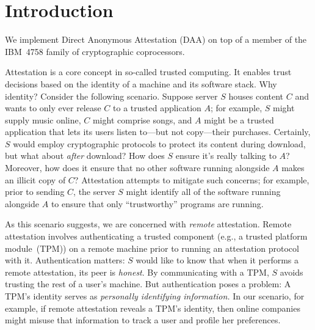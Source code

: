 \section{Introduction}

\begin{comment}
	\emph{PDS:}
	Our goal is to motivate and sketch out our work.
	
	At the moment, I've simply dropped in a copy of our proposal.
	Even if those ideas suffice, we clearly need to adjust the text since
	we're now talking about what we have done rather
	than what we propose to do.
	
	Let's consider improving the ideas.
	
	I want to move away from
	TCG-style attestation to the more general problem of
	\emph{authenticating a remote application}.
	Identifying
	all of the software running on a machine may well uniquely
	identify the machine.
	Authentication without inherently leaking identity enables
	attestation. What other protocols does it enable?
	Voting protocols?
\end{comment}
\fi

We implement Direct Anonymous Attestation (DAA) on top of
a member of the IBM~4758 family of
cryptographic coprocessors.

Attestation is a core concept in so-called trusted computing.
It enables trust decisions based on the identity of a machine
and its software stack.
Why identity?
Consider the following scenario.
Suppose server $S$ houses content $C$ and wants to
only ever release $C$ to a trusted application $A$;
for example, $S$ might supply music online,
$C$ might comprise songs,
and $A$ might be a trusted application that
lets its users listen to---but not copy---their purchases.
Certainly, $S$ would employ cryptographic protocols to protect
its content during download, but what about \emph{after} download?
How does $S$ ensure it's really talking to $A$? Moreover, how does
it ensure that no other software running alongside $A$ makes an illicit
copy of $C$?
Attestation attempts to mitigate such concerns; for example,
prior to sending $C$, the server $S$ might identify all of the
software running alongside $A$ to ensure that only ``trustworthy'' programs
are running.

As this scenario suggests, we are concerned with \emph{remote} attestation.
Remote attestation involves authenticating a trusted component (e.g., a trusted platform module~(TPM))
on a remote machine prior to running an attestation protocol
with it.
Authentication matters: $S$ would like to know that when it performs a remote attestation,
its peer is \emph{honest}.
By communicating with a TPM, $S$ avoids trusting
the rest of a user's machine.
But authentication poses a problem: A TPM's identity serves as
\emph{personally identifying information.}
In our scenario, for example, if remote attestation reveals a TPM's identity, then
online companies might misuse that information to track a user and profile
her preferences.

